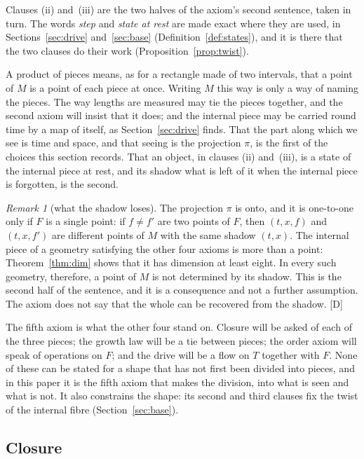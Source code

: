\documentclass[11pt,a4paper]{article}
\theoremstyle{plain}
\theoremstyle{definition}
\theoremstyle{remark}
\newtheorem{remark}[theorem]{Remark}
\newcommand{\rigD}{[\textup{D}]}
\begin{document}
Clauses (ii) and~(iii) are the two halves of the axiom's second sentence, taken in turn. The words \emph{step} and \emph{state at rest} are made exact where they are used, in Sections~\ref{sec:drive} and~\ref{sec:base} (Definition~\ref{def:states}), and it is there that the two clauses do their work (Proposition~\ref{prop:twist}).

A product of pieces means, as for a rectangle made of two intervals, that a point of $M$ is a point of each piece at once. Writing $M$ this way is only a way of naming the pieces. The way lengths are measured may tie the pieces together, and the second axiom will insist that it does; and the internal piece may be carried round time by a map of itself, as Section~\ref{sec:drive} finds. That the part along which we see is time and space, and that seeing is the projection $\pi$, is the first of the choices this section records. That an object, in clauses (ii) and~(iii), is a state of the internal piece at rest, and its shadow what is left of it when the internal piece is forgotten, is the second.

\begin{remark}[what the shadow loses]\label{rem:loss}
The projection $\pi$ is onto, and it is one-to-one only if $F$ is a single point: if $f\neq f'$ are two points of $F$, then $(t,x,f)$ and $(t,x,f')$ are different points of $M$ with the same shadow $(t,x)$. The internal piece of a geometry satisfying the other four axioms is more than a point: Theorem~\ref{thm:dim} shows that it has dimension at least eight. In every such geometry, therefore, a point of $M$ is not determined by its shadow. This is the second half of the sentence, and it is a consequence and not a further assumption. The axiom does not say that the whole can be recovered from the shadow. \rigD
\end{remark}

The fifth axiom is what the other four stand on. Closure will be asked of each of the three pieces; the growth law will be a tie between pieces; the order axiom will speak of operations on $F$; and the drive will be a flow on $T$ together with $F$. None of these can be stated for a shape that has not first been divided into pieces, and in this paper it is the fifth axiom that makes the division, into what is seen and what is not. It also constrains the shape: its second and third clauses fix the twist of the internal fibre (Section~\ref{sec:base}).

\subsection{Closure}\label{sec:A1}
\end{document}
